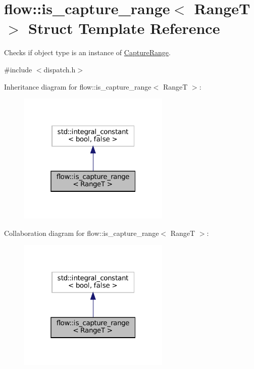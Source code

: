 \hypertarget{structflow_1_1is__capture__range}{}\section{flow\+:\+:is\+\_\+capture\+\_\+range$<$ RangeT $>$ Struct Template Reference}
\label{structflow_1_1is__capture__range}


Checks if object type is an instance of \hyperlink{structflow_1_1_capture_range}{Capture\+Range}.  




{\ttfamily \#include $<$dispatch.\+h$>$}



Inheritance diagram for flow\+:\+:is\+\_\+capture\+\_\+range$<$ RangeT $>$\+:\nopagebreak
\begin{figure}[H]
\begin{center}
\leavevmode
\includegraphics[width=205pt]{structflow_1_1is__capture__range__inherit__graph}
\end{center}
\end{figure}


Collaboration diagram for flow\+:\+:is\+\_\+capture\+\_\+range$<$ RangeT $>$\+:\nopagebreak
\begin{figure}[H]
\begin{center}
\leavevmode
\includegraphics[width=205pt]{structflow_1_1is__capture__range__coll__graph}
\end{center}
\end{figure}


